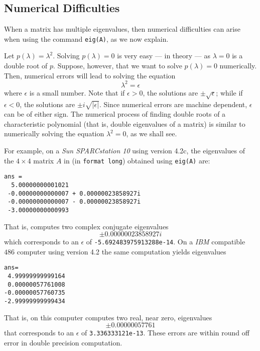 \documentclass{ximera}
\begin{document}
\subsection*{Numerical Difficulties}

When a matrix has multiple eigenvalues, then numerical difficulties
can arise when using the \Matlab command {\tt eig(A)}, as we now explain.

Let $p(\lambda)=\lambda^2$.  Solving $p(\lambda)=0$ is very easy --- in theory
--- as $\lambda=0$ is a double root of $p$.  Suppose, however, that 
we want to solve $p(\lambda)=0$ numerically.  Then, numerical errors 
will lead to solving the equation  
\[
\lambda^2 = \epsilon
\]
where $\epsilon$ is a small number.  Note that if $\epsilon>0$, the 
solutions are $\pm\sqrt{\epsilon}$; while if $\epsilon<0$, the solutions 
are $\pm i\sqrt{|\epsilon|}$.  Since numerical errors are machine 
dependent, $\epsilon$ can be of either sign.  The numerical process of
finding double roots of a characteristic polynomial (that is, double 
eigenvalues of a matrix) is similar to numerically solving the equation 
$\lambda^2=0$, as we shall see.

For example, on a
{\em Sun SPARCstation 10\/} using \Matlab version 4.2c, the eigenvalues 
of the $4\times 4$ matrix $A$ in  (in {\tt format long}) 
obtained using {\tt eig(A)} are:
\begin{verbatim}
ans = 
  5.00000000001021                    
 -0.00000000000007 + 0.00000023858927i
 -0.00000000000007 - 0.00000023858927i
 -3.00000000000993       
\end{verbatim}
That is, \Matlab computes two complex conjugate eigenvalues
\[
\pm 0.00000023858927i
\]
which corresponds to an $\epsilon$ of {\tt -5.692483975913288e-14}.
On a {\em IBM\/} compatible $486$ computer using \Matlab version 4.2
the same computation yields eigenvalues
\begin{verbatim}
ans=
 4.99999999999164
 0.00000057761008
-0.00000057760735
-2.99999999999434
\end{verbatim}
That is, on this computer \Matlab computes two real, near zero, 
eigenvalues 
\[ 
\pm 0.00000057761
\]
that corresponds to an $\epsilon$ of {\tt 3.336333121e-13}. These
errors are within round off error in 
double precision computation.
\end{document}
